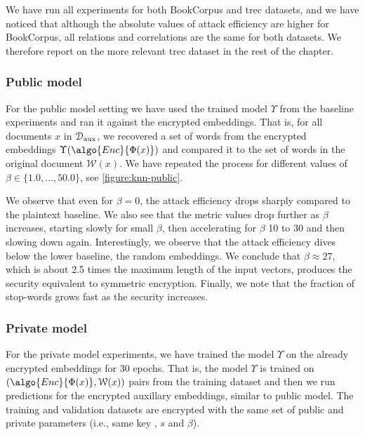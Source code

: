 				We have run all experiments for both BookCorpus and \acrshort{trec} datasets, and we have noticed that although the absolute values of attack efficiency are higher for BookCorpus, all relations and correlations are the same for both datasets.
				We therefore report on the more relevant \acrshort{trec} dataset in the rest of the chapter.

			\subsubsection{Public model}

				For the public model setting we have used the trained model $\Upsilon$ from the baseline experiments and ran it against the encrypted embeddings.
				That is, for all documents $x$ in $\mathcal{D}_\text{aux}$, we recovered a set of words from the encrypted embeddings $\Upsilon( \algo{Enc}{ \Phi(x) } )$ and compared it to the set of words in the original document $\mathcal{W}(x)$.
				We have repeated the process for different values of $\beta \in \{ 1.0, \ldots, 50.0 \}$, see \cref{figure:knn-public}.

				

				We observe that even for $\beta = 0$, the attack efficiency drops sharply compared to the plaintext baseline.
				We also see that the metric values drop further as $\beta$ increases, starting slowly for small $\beta$, then accelerating for $\beta$ 10 to 30 and then slowing down again.
				Interestingly, we observe that the attack efficiency dives below the lower baseline, the random embeddings.
				We conclude that $\beta \approx 27$, which is about 2.5 times the maximum length of the input vectors, produces the security equivalent to symmetric encryption.
				Finally, we note that the fraction of stop-words grows fast as the security increases.

			\subsubsection{Private model}

				For the private model experiments, we have trained the model $\Upsilon$ on the already encrypted embeddings for 30 epochs.
				That is, the model $\Upsilon$ is trained on $ ( \algo{Enc}{ \Phi(x) }, \allowbreak \mathcal{W}(x) ) $ pairs from the training dataset and then we run predictions for the encrypted auxillary embeddings, similar to public model.
				The training and validation datasets are encrypted with the same set of public and private parameters (i.e., same key \key{}, $s$ and $\beta$).

